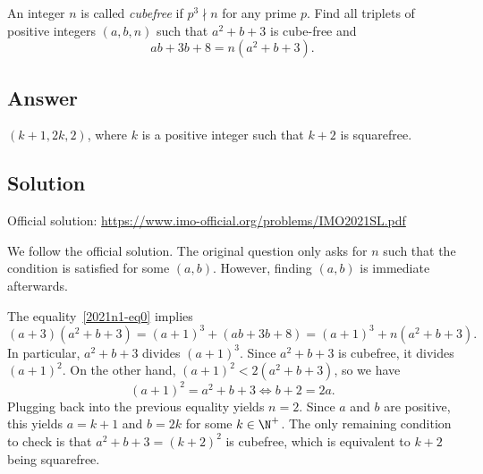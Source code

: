 An integer $n$ is called \emph{cubefree} if $p^3 \nmid n$ for any prime $p$.
Find all triplets of positive integers $(a, b, n)$ such that $a^2 + b + 3$ is cube-free and
\[ ab + 3b + 8 = n(a^2 + b + 3). \tag{*}\label{2021n1-eq0} \]



\subsection*{Answer}

$(k + 1, 2k, 2)$, where $k$ is a positive integer such that $k + 2$ is squarefree.



\subsection*{Solution}

Official solution: \url{https://www.imo-official.org/problems/IMO2021SL.pdf}

We follow the official solution.
The original question only asks for $n$ such that the condition is satisfied for some $(a, b)$.
However, finding $(a, b)$ is immediate afterwards.

The equality~\eqref{2021n1-eq0} implies
\[ (a + 3)(a^2 + b + 3) = (a + 1)^3 + (ab + 3b + 8) = (a + 1)^3 + n(a^2 + b + 3). \]
In particular, $a^2 + b + 3$ divides $(a + 1)^3$.
Since $a^2 + b + 3$ is cubefree, it divides $(a + 1)^2$.
On the other hand, $(a + 1)^2 < 2(a^2 + b + 3)$, so we have
\[ (a + 1)^2 = a^2 + b + 3 \iff b + 2 = 2a. \]
Plugging back into the previous equality yields $n = 2$.
Since $a$ and $b$ are positive, this yields $a = k + 1$ and $b = 2k$ for some $k \in \N^+$.
The only remaining condition to check is that $a^2 + b + 3 = (k + 2)^2$ is cubefree, which is equivalent to $k + 2$ being squarefree.
